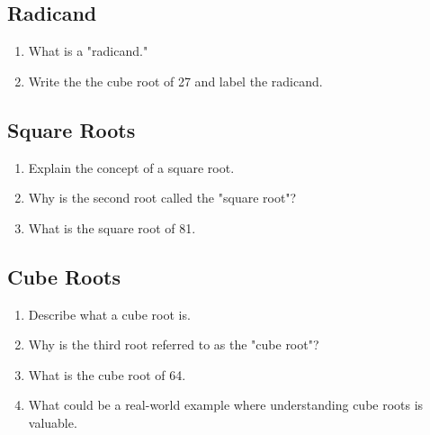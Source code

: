 \documentclass[12pt]{article}
\begin{document}

\subsection*{Radicand}
\begin{enumerate}
\item What is a "radicand."
\item Write the the cube root of 27 and label the radicand.
\end{enumerate}

\subsection*{Square Roots}
\begin{enumerate}
\item Explain the concept of a square root.
\item Why is the second root called the "square root"?
\item What is the square root of 81.
\end{enumerate}

\subsection*{Cube Roots}
\begin{enumerate}
\item Describe what a cube root is.
\item Why is the third root referred to as the "cube root"?
\item What is the cube root of 64.
\item What could be a real-world example where understanding cube roots is valuable.
\end{enumerate}
\end{document}
